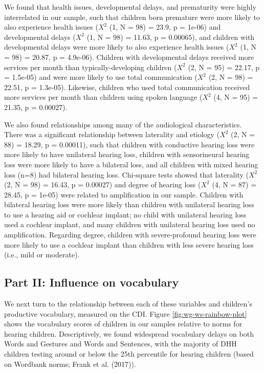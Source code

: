 \documentclass[english,man]{apa6}
\begin{document}
We found that health issues, developmental delays, and prematurity were highly interrelated in our sample, such that children born premature were more likely to also experience health issues (\(X^2\) (1, N = 98) = 23.9, p = 1e-06) and developmental delays (\(X^2\) (1, N = 98) = 11.63, p = 0.00065), and children with developmental delays were more likely to also experience health issues (\(X^2\) (1, N = 98) = 20.87, p = 4.9e-06). Children with developmental delays received more services per month than typically-developing children (\(X^2\) (2, N = 95) = 22.17, p = 1.5e-05) and were more likely to use total communication (\(X^2\) (2, N = 98) = 22.51, p = 1.3e-05). Likewise, children who used total communication received more services per month than children using spoken language (\(X^2\) (4, N = 95) = 21.35, p = 0.00027).

We also found relationships among many of the audiological characteristics. There was a significant relationship between laterality and etiology (\(X^2\) (2, N = 88) = 18.29, p = 0.00011), such that children with conductive hearing loss were more likely to have unilateral hearing loss, children with sensorineural hearing loss were more likely to have a bilateral loss, and all children with mixed hearing loss (n=8) had bilateral hearing loss. Chi-square tests showed that laterality (\(X^2\) (2, N = 98) = 16.43, p = 0.00027) and degree of hearing loss (\(X^2\) (4, N = 87) = 28.45, p = 1e-05) were related to amplification in our sample. Children with bilateral hearing loss were more likely than children with unilateral hearing loss to use a hearing aid or cochlear implant; no child with unilateral hearing loss used a cochlear implant, and many children with unilateral hearing loss used no amplification. Regarding degree, children with severe-profound hearing loss were more likely to use a cochlear implant than children with less severe hearing loss (i.e., mild or moderate).

\hypertarget{part-ii-influence-on-vocabulary}{%
\subsection{Part II: Influence on vocabulary}\label{part-ii-influence-on-vocabulary}}

We next turn to the relationship between each of these variables and children's productive vocabulary, measured on the CDI. Figure \ref{fig:wg-ws-rainbow-plot} shows the vocabulary scores of children in our samples relative to norms for hearing children. Descriptively, we found widespread vocabulary delays on both Words and Gestures and Words and Sentences, with the majority of DHH children testing around or below the 25th percentile for hearing children (based on Wordbank norms; Frank et al. (2017)).
\end{document}
